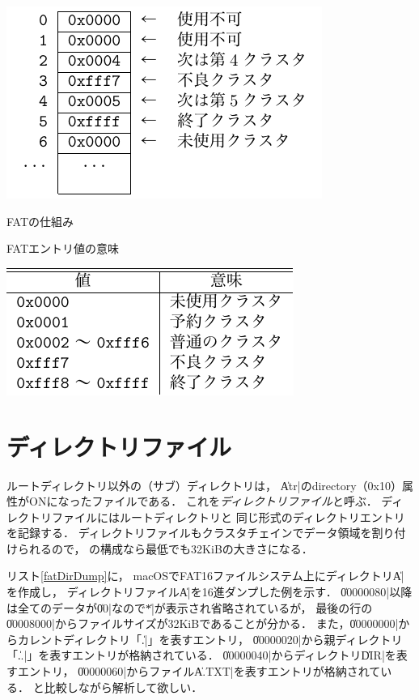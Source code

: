 \begin{table}[btp]
  \centering
  \begin{minipage}[c]{0.4\textwidth}
    \makeatletter
    \def\@captype{figure}
    \makeatother
    \centerline{\includegraphics[scale=1.0]{Fig/fatConcept.pdf}}
    \caption{FATの仕組み}
    \label{fig:fatConcept}
  \end{minipage}
  \begin{minipage}{0.5\textwidth}
    \caption{FATエントリ値の意味}
    \label{tab:fatClsNum}
    \centerline{\includegraphics[scale=1.0]{Tbl/fatClsNum.pdf}}
  \end{minipage}
\end{table}

\section{ディレクトリファイル}
ルートディレクトリ以外の（サブ）ディレクトリは，
\|Atr|のdirectory（0x10）属性がONになったファイルである．
これを\emph{ディレクトリファイル}と呼ぶ．
ディレクトリファイルにはルートディレクトリと
同じ形式のディレクトリエントリを記録する．
ディレクトリファイルもクラスタチェインでデータ領域を割り付けられるので，
の構成なら最低でも32KiBの大きさになる．

リスト\ref{fatDirDump}に，
macOSでFAT16ファイルシステム上にディレクトリ\|A|を作成し，
ディレクトリファイル\|A|を16進ダンプした例を示す．
\|00000080|以降は全てのデータが\|00|なので\|*|が表示され省略されているが，
最後の行の\|00008000|からファイルサイズが32KiBであることが分かる．
また，\|00000000|からカレントディレクトリ「\|.|」を表すエントリ，
\|00000020|から親ディレクトリ「\|..|」を表すエントリが格納されている．
\|00000040|からディレクトリ\|DIR|を表すエントリ，
\|00000060|からファイル\|A.TXT|を表すエントリが格納されている．
と比較しながら解析して欲しい．

